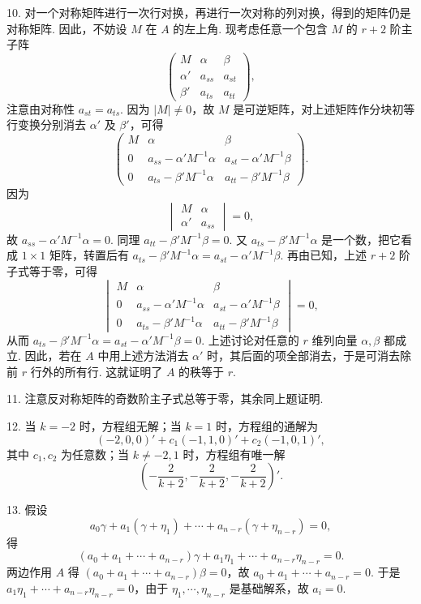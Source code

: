 \documentclass[UTF8, 12pt, fontset=fandol, oneside]{ctexart}
\begin{document}
10. 对一个对称矩阵进行一次行对换，再进行一次对称的列对换，得到的矩阵仍是对称矩阵. 因此，不妨设 $M$ 在 $A$ 的左上角. 现考虑任意一个包含 $M$ 的 $r+2$ 阶主子阵
\[
\begin{pmatrix}
M&\alpha&\beta\\
\alpha'&a_{ss}&a_{st}\\
\beta'&a_{ts}&a_{tt}
\end{pmatrix},
\]
注意由对称性 $a_{st}=a_{ts}$. 因为 $|M|\ne 0$，故 $M$ 是可逆矩阵，对上述矩阵作分块初等行变换分别消去 $\alpha'$ 及 $\beta'$，可得
\[
\begin{pmatrix}
M&\alpha&\beta\\
0&a_{ss}-\alpha'M^{-1}\alpha&a_{st}-\alpha'M^{-1}\beta\\
0&a_{ts}-\beta'M^{-1}\alpha&a_{tt}-\beta'M^{-1}\beta
\end{pmatrix}.
\]
因为
\[
\begin{vmatrix}
M&\alpha\\
\alpha'&a_{ss}
\end{vmatrix}=0,
\]
故 $a_{ss}-\alpha'M^{-1}\alpha=0$. 同理 $a_{tt}-\beta'M^{-1}\beta=0$. 又 $a_{ts}-\beta'M^{-1}\alpha$ 是一个数，把它看成 $1\times 1$ 矩阵，转置后有 $a_{ts}-\beta'M^{-1}\alpha=a_{st}-\alpha'M^{-1}\beta$. 再由已知，上述 $r+2$ 阶子式等于零，可得
\[
\begin{vmatrix}
M&\alpha&\beta\\
0&a_{ss}-\alpha'M^{-1}\alpha&a_{st}-\alpha'M^{-1}\beta\\
0&a_{ts}-\beta'M^{-1}\alpha&a_{tt}-\beta'M^{-1}\beta
\end{vmatrix}=0,
\]
从而 $a_{ts}-\beta'M^{-1}\alpha=a_{st}-\alpha'M^{-1}\beta=0$. 上述讨论对任意的 $r$ 维列向量 $\alpha,\beta$ 都成立. 因此，若在 $A$ 中用上述方法消去 $\alpha'$ 时，其后面的项全部消去，于是可消去除前 $r$ 行外的所有行. 这就证明了 $A$ 的秩等于 $r$.

11. 注意反对称矩阵的奇数阶主子式总等于零，其余同上题证明.

12. 当 $k=-2$ 时，方程组无解；当 $k=1$ 时，方程组的通解为
\[
(-2,0,0)'+c_1(-1,1,0)'+c_2(-1,0,1)',
\]
其中 $c_1,c_2$ 为任意数；当 $k\ne -2,1$ 时，方程组有唯一解
\[
\left(-\frac{2}{k+2},-\frac{2}{k+2},-\frac{2}{k+2}\right)'.
\]

13. 假设
\[
a_0\gamma+a_1(\gamma+\eta_1)+\cdots+a_{n-r}(\gamma+\eta_{n-r})=0,
\]
得
\[
(a_0+a_1+\cdots+a_{n-r})\gamma+a_1\eta_1+\cdots+a_{n-r}\eta_{n-r}=0.
\]
两边作用 $A$ 得 $(a_0+a_1+\cdots+a_{n-r})\beta=0$，故 $a_0+a_1+\cdots+a_{n-r}=0$. 于是 $a_1\eta_1+\cdots+a_{n-r}\eta_{n-r}=0$，由于 $\eta_1,\cdots,\eta_{n-r}$ 是基础解系，故 $a_i=0$.
\end{document}
